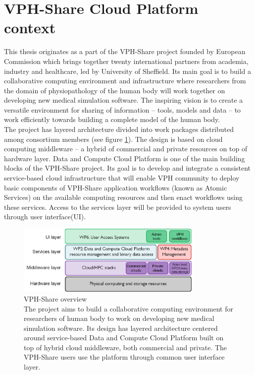 \section{VPH-Share Cloud Platform context}
This thesis originates as a part of the VPH-Share project founded by European Commission
which brings together twenty international partners from academia, industry and healthcare,
led by University of Sheffield. Its main goal is to build a collaborative computing
environment and infrastructure where researchers from the domain of physiopathology of
the human body will work together on developing new medical simulation software. The inspiring
vision is to create a versatile environment for sharing of information -- tools, models and data
-- to work efficiently towards building a complete model of the human body.\\

The project has layered architecture divided into work packages distributed among consortium
members (see figure \ref{fig:dri-high-level}). The design is based on cloud computing middleware
-- a hybrid of commercial and private resources on top of hardware layer. Data and Compute
Cloud Platform is one of the main building blocks of the VPH-Share project. Its goal is to
develop and integrate a consistent service-based cloud infrastructure that will enable VPH
community to deploy basic components of VPH-Share application workflows (known as Atomic Services)
on the available computing resources and then enact workflows using these services. Access to the
services layer will be provided to system users through user interface(UI).

\begin{figure}[h!]
	\centering
	\includegraphics[width=0.8\textwidth]{images/vph-high-level.png}
	\caption{VPH-Share overview\\
	The project aims to build a collaborative computing environment
	for researchers of human body to work on developing new medical simulation software.
	Its design has layered architecture centered around service-based Data and Compute
	Cloud Platform built on top of hybrid cloud middleware, both commercial and private. The VPH-Share
	users use the platform through common user interface layer.}
	\label{fig:dri-high-level}
\end{figure} 


